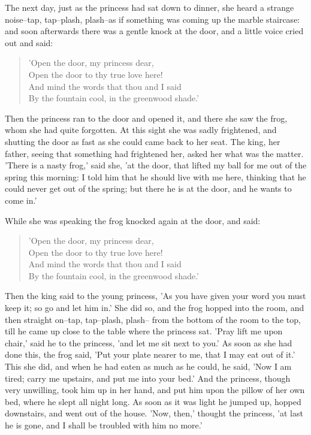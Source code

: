 \documentclass[12pt]{book}
\begin{document}
The next day, just as the princess had sat down to dinner, she heard a
strange noise--tap, tap--plash, plash--as if something was coming up
the marble staircase: and soon afterwards there was a gentle knock at
the door, and a little voice cried out and said:

\begin{verse}
 'Open the door, my princess dear,\\
  Open the door to thy true love here!\\
  And mind the words that thou and I said\\
  By the fountain cool, in the greenwood shade.'
\end{verse}

Then the princess ran to the door and opened it, and there she saw the
frog, whom she had quite forgotten. At this sight she was sadly
frightened, and shutting the door as fast as she could came back to
her seat. The king, her father, seeing that something had frightened
her, asked her what was the matter. 'There is a nasty frog,' said she,
'at the door, that lifted my ball for me out of the spring this
morning: I told him that he should live with me here, thinking that he
could never get out of the spring; but there he is at the door, and he
wants to come in.'

While she was speaking the frog knocked again at the door, and said:

\begin{verse}
 'Open the door, my princess dear,\\
  Open the door to thy true love here!\\
  And mind the words that thou and I said\\
  By the fountain cool, in the greenwood shade.'
\end{verse}

Then the king said to the young princess, 'As you have given your word
you must keep it; so go and let him in.' She did so, and the frog
hopped into the room, and then straight on--tap, tap--plash, plash--
from the bottom of the room to the top, till he came up close to the
table where the princess sat. 'Pray lift me upon chair,' said he to
the princess, 'and let me sit next to you.' As soon as she had done
this, the frog said, 'Put your plate nearer to me, that I may eat out
of it.' This she did, and when he had eaten as much as he could, he
said, 'Now I am tired; carry me upstairs, and put me into your bed.'
And the princess, though very unwilling, took him up in her hand, and
put him upon the pillow of her own bed, where he slept all night long.
As soon as it was light he jumped up, hopped downstairs, and went out
of the house. 'Now, then,' thought the princess, 'at last he is gone,
and I shall be troubled with him no more.'
\end{document}
